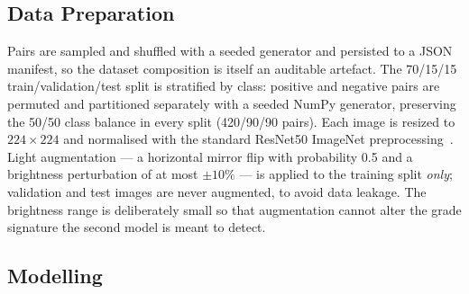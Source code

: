 \documentclass[conference]{IEEEtran}
\begin{document}
\subsection{Data Preparation}
Pairs are sampled and shuffled with a seeded generator and persisted to a JSON
manifest, so the dataset composition is itself an auditable artefact. The
70/15/15 train/validation/test split is stratified by class: positive and
negative pairs are permuted and partitioned separately with a seeded NumPy
generator, preserving the 50/50 class balance in every split (420/90/90
pairs). Each image is resized to $224 \times 224$ and normalised with the
standard ResNet50 ImageNet preprocessing~\cite{he2016resnet}. Light
augmentation --- a horizontal mirror flip with probability 0.5 and a
brightness perturbation of at most $\pm 10\%$ --- is applied to the training
split \emph{only}; validation and test images are never augmented, to avoid
data leakage. The brightness range is deliberately small so that augmentation
cannot alter the grade signature the second model is meant to detect.

\subsection{Modelling}
\end{document}
